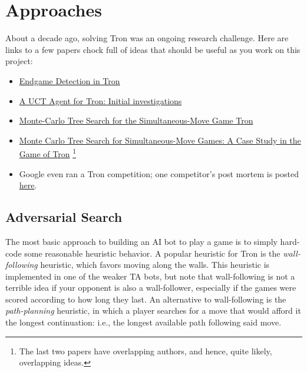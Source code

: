 \documentclass{article}
\begin{document}
\section{Approaches}

About a decade ago, solving Tron was an ongoing research challenge.
Here are links to a few papers chock full of ideas that should be
useful as you work on this project:

\begin{itemize}
\item \href{https://project.dke.maastrichtuniversity.nl/games/files/bsc/Kang_Bsc-paper.pdf}{Endgame Detection in Tron}
  \\ [-4ex]
  
\item \href{https://ieeexplore.ieee.org/document/5593331}{A UCT Agent for Tron: Initial investigations}
  \\ [-4ex]

\item \href{https://dke.maastrichtuniversity.nl/m.winands/documents/Tronpaper.pdf}{Monte-Carlo Tree Search for the Simultaneous-Move Game Tron}
  \\ [-4ex]

\item \href{http://mlanctot.info/files/papers/sm-tron-bnaic2013.pdf}{Monte Carlo Tree Search for Simultaneous-Move Games: A Case Study in the Game of Tron}%
\footnote{The last two papers have overlapping authors, and hence, quite likely, overlapping ideas.}
  \\ [-4ex]

\item Google even ran a Tron competition; one competitor's post mortem is posted
\href{https://www.a1k0n.net/2010/03/04/google-ai-postmortem.html}{here}.
  \\ [-4ex]
\end{itemize}


\subsection{Adversarial Search}
The most basic approach to building an AI bot to play a game is to
simply hard-code some reasonable heuristic behavior.  A popular
heuristic for Tron is the \emph{wall-following\/} heuristic, which
favors moving along the walls.  This heuristic is implemented in one
of the weaker TA bots, but note that wall-following is not a terrible
idea if your opponent is also a wall-follower,
especially if the games were scored according to how long they last.
%
An alternative to wall-following is the \emph{path-planning\/}
heuristic, in which a player searches for a move that would afford it
the longest continuation: i.e., the longest available path following said move.
\end{document}
